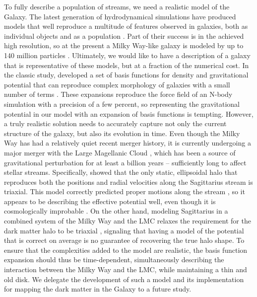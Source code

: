 \documentclass[modern]{aastex61}
\begin{document}
To fully describe a population of streams, we need a realistic model of the Galaxy.
The latest generation of hydrodynamical simulations have produced models that well reproduce a multitude of features observed in galaxies, both as individual objects \citep[e.g.,][]{wetzel2016} and as a population \citep[e.g.,][]{pillepich2018,nelson2018}.
Part of their success is in the achieved high resolution, so at the present a Milky Way-like galaxy is modeled by up to 140 million particles \citep{wetzel2016}.
Ultimately, we would like to have a description of a galaxy that is representative of these models, but at a fraction of the numerical cost.
In the classic study, \citet{ho} developed a set of basis functions for density and gravitational potential that can reproduce complex morphology of galaxies with a small number of terms \citep[e.g.,][]{lowing2011, lilley2018a, lilley2018b}.
These expansions reproduce the force field of an N-body simulation with a precision of a few percent, so representing the gravitational potential in our model with an expansion of basis functions is tempting.
However, a truly realistic solution needs to accurately capture not only the current structure of the galaxy, but also its evolution in time.
Even though the Milky Way has had a relatively quiet recent merger history, it is currently undergoing a major merger with the Large Magellanic Cloud \citep[e.g.,][]{besla2007, penarrubia2016}, which has been a source of gravitational perturbation for at least a billion years -- sufficiently long to affect stellar streams.
Specifically, \citet{lm10} showed that the only static, ellipsoidal halo that reproduces both the positions and radial velocities along the Sagittarius stream is triaxial.
This model correctly predicted proper motions along the stream \citep{sohn2015}, so it appears to be describing the effective potential well, even though it is cosmologically improbable \citep{debattista2013}.
On the other hand, modeling Sagittarius in a combined system of the Milky Way and the LMC relaxes the requirement for the dark matter halo to be triaxial \citep{vch2013}, signaling that having a model of the potential that is correct on average is no guarantee of recovering the true halo shape.
To ensure that the complexities added to the model are realistic, the basis function expansion should thus be time-dependent, simultaneously describing the interaction between the Milky Way and the LMC, while maintaining a thin and old disk. 
We delegate the development of such a model and its implementation for mapping the dark matter in the Galaxy to a future study.
\end{document}
